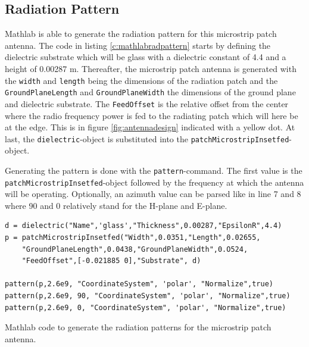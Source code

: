 \subsection{Radiation Pattern}
Mathlab is able to generate the radiation pattern for this microstrip patch antenna.
The code in  listing \ref{c:mathlabradpattern} starts by defining the dielectric substrate which will be glass with a \gls{dielectric constant}
of 4.4 and a height of 0.00287 m. Thereafter, the microstrip patch antenna is generated with the \verb|width| and \verb|length| being the dimensions
of the radiation patch and the \verb|GroundPlaneLength| and \verb|GroundPlaneWidth| the dimensions of the ground plane and dielectric substrate.
The \verb|FeedOffset| is the relative offset from the center where the radio frequency power is fed to the radiating patch which will here be
at the edge. This is in figure \ref{fig:antennadesign} indicated with a yellow dot. At last, the \verb|dielectric|-object is substituted into the 
\verb|patchMicrostripInsetfed|-object.

Generating the pattern is done with the \verb|pattern|-command. The first value is the \\ \verb|patchMicrostripInsetfed|-object followed by the frequency
at which the antenna will be operating. Optionally, an azimuth value can be parsed like in line 7 and 8 where 90 and 0 relatively stand for the H-plane and E-plane.

\begin{listing}[h!]
\begin{verbatim}
d = dielectric("Name",'glass',"Thickness",0.00287,"EpsilonR",4.4)
p = patchMicrostripInsetfed("Width",0.0351,"Length",0.02655,
    "GroundPlaneLength",0.0438,"GroundPlaneWidth",0.O524,
    "FeedOffset",[-0.021885 0],"Substrate", d)

pattern(p,2.6e9, "CoordinateSystem", 'polar', "Normalize",true)
pattern(p,2.6e9, 90, "CoordinateSystem", 'polar', "Normalize",true)
pattern(p,2.6e9, 0, "CoordinateSystem", 'polar', "Normalize",true)
\end{verbatim}
\caption{Mathlab code to generate the radiation patterns for the microstrip patch antenna.}
\label{c:mathlabradpattern}
\end{listing}

